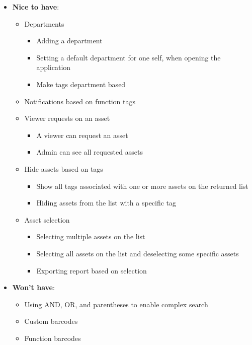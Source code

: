 \begin{itemize}
    \item \textbf{Nice to have}:
        \begin{itemize}
            \item Departments
            \begin{itemize}
                \item Adding a department
                \item Setting a default department for one self, when opening the application
                \item Make tags department based
            \end{itemize}
            \item Notifications based on function tags
            \item Viewer requests on an asset
            \begin{itemize}
                \item A viewer can request an asset
                \item Admin can see all requested assets
            \end{itemize}
            \item Hide assets based on tags
            \begin{itemize}
                \item Show all tags associated with one or more assets on the returned list
                \item Hiding assets from the list with a specific tag
            \end{itemize}
            \item Asset selection
            \begin{itemize}
                \item Selecting multiple assets on the list
                \item Selecting all assets on the list and deselecting some specific assets
                \item Exporting report based on selection
            \end{itemize}
        \end{itemize}
        
    \item \textbf{Won't have}:
        \begin{itemize}
            \item Using AND, OR, and parentheses to enable complex search
            \item Custom barcodes
            \item Function barcodes
        \end{itemize}
\end{itemize}


